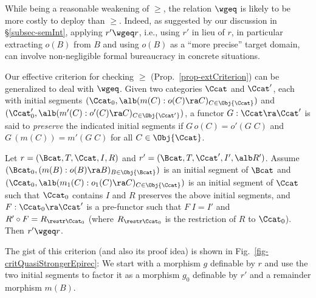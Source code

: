 While being a reasonable weakening of $\geq$, %
the 
relation $\wgeq$ is likely to be more costly to deploy %
than $\geq$. Indeed, 
as suggested by our discussion in \S\ref{subsec-semInt}, 
applying $r' \wgeq  r$, i.e., using $r'$ in lieu of $r$, in particular extracting $o(B)$ from $B$ and using $o(B)$ as a ``more precise'' target domain, 
can 
involve non-negligible formal bureaucracy in concrete situations.
%


Our effective criterion for checking $\geq$ (Prop.~\ref{prop-extCriterion}) can be generalized to deal with $\wgeq$. 
Given two categories $\Ccat$ and $\Ccat'$, each with 
initial segments $(\Ccat_0,\alb(m(C):o(C)\ra C)_{C \in \Obj{\Ccat}})$ 
and $(\Ccat_0',\alb(m'(C):o'(C)\ra C)_{C \in \Obj{\Ccat'}})$, a functor $G: \Ccat \ra \Ccat'$ is said to \emph{preserve} the indicated initial segments if $G\,o(C)=o'(G\;C)$ and  $G\,(m(C))=m'(G\;C)$ for all $C \in \Obj{\Ccat}$. 

\begin{prop}\rm
	\label{prop-WeakExtCriterion} 
	Let $r = (\Bcat,T,\Ccat,I,R)$ and 
	$r' = (\Bcat,T,\Ccat',I',\alb R')$.  %
	Assume 
	$(\Bcat_0,(m(B):o(B)\ra B)_{B \in \Obj{\Bcat}})$ is an initial segment of $\Bcat$
	and $(\Ccat_0,\alb(m_1(C):o_1(C)\ra C)_{C \in \Obj{\Ccat}})$ is an initial segment of $\Ccat$ 
	such that $\Ccat_0$ contains $I$ and 
	$R$ preserves the above initial segments, 
	and $F : \Ccat_0 \ra \Ccat'$ is a %
	pre-functor such that 
	$F\;I = I'$ and $R' \circ F = R_{\restr\Ccat_0}$ 
	 (where $R_{\restr\Ccat_0}$ is the restriction of $R$ to $\Ccat_0$).  
	Then $r' \wgeq r$. 
\end{prop}
	
The gist of this criterion (and also its proof idea) 
is shown in Fig.~\ref{fig-critQuasiStrongerEpirec}: We start with a morphism $g$ %
definable by $r$ and use the two initial segments to factor it 
as %
a morphism $g_0$ definable by $r'$  and a remainder morphism $m(B)$.  
	
